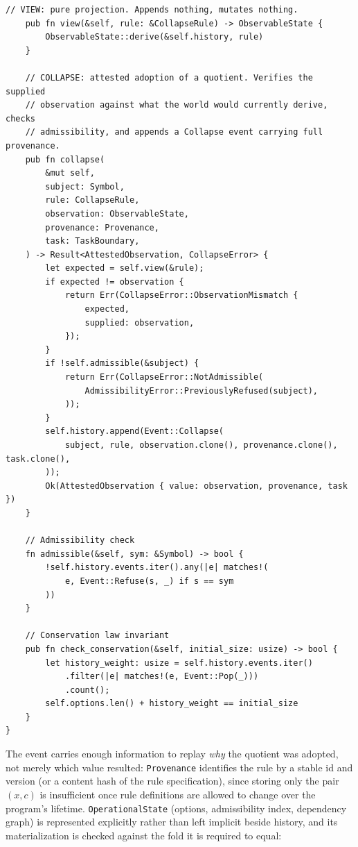 \documentclass[12pt, a4paper, openany]{book}
\theoremstyle{plain}
\theoremstyle{definition}
\theoremstyle{remark}
\begin{document}
\begin{lstlisting}[style=rust, caption={Complete World structure with view/collapse split}]
    // VIEW: pure projection. Appends nothing, mutates nothing.
    pub fn view(&self, rule: &CollapseRule) -> ObservableState {
        ObservableState::derive(&self.history, rule)
    }

    // COLLAPSE: attested adoption of a quotient. Verifies the supplied
    // observation against what the world would currently derive, checks
    // admissibility, and appends a Collapse event carrying full provenance.
    pub fn collapse(
        &mut self,
        subject: Symbol,
        rule: CollapseRule,
        observation: ObservableState,
        provenance: Provenance,
        task: TaskBoundary,
    ) -> Result<AttestedObservation, CollapseError> {
        let expected = self.view(&rule);
        if expected != observation {
            return Err(CollapseError::ObservationMismatch {
                expected,
                supplied: observation,
            });
        }
        if !self.admissible(&subject) {
            return Err(CollapseError::NotAdmissible(
                AdmissibilityError::PreviouslyRefused(subject),
            ));
        }
        self.history.append(Event::Collapse(
            subject, rule, observation.clone(), provenance.clone(), task.clone(),
        ));
        Ok(AttestedObservation { value: observation, provenance, task })
    }

    // Admissibility check
    fn admissible(&self, sym: &Symbol) -> bool {
        !self.history.events.iter().any(|e| matches!(
            e, Event::Refuse(s, _) if s == sym
        ))
    }

    // Conservation law invariant
    pub fn check_conservation(&self, initial_size: usize) -> bool {
        let history_weight: usize = self.history.events.iter()
            .filter(|e| matches!(e, Event::Pop(_)))
            .count();
        self.options.len() + history_weight == initial_size
    }
}
\end{lstlisting}

The event carries enough information to replay \emph{why} the quotient was
adopted, not merely which value resulted: \texttt{Provenance} identifies the
rule by a stable id and version (or a content hash of the rule specification),
since storing only the pair $(x, c)$ is insufficient once rule definitions are
allowed to change over the program's lifetime. \texttt{OperationalState}
(options, admissibility index, dependency graph) is represented explicitly
rather than left implicit beside history, and its materialization is checked
against the fold it is required to equal:
\end{document}
